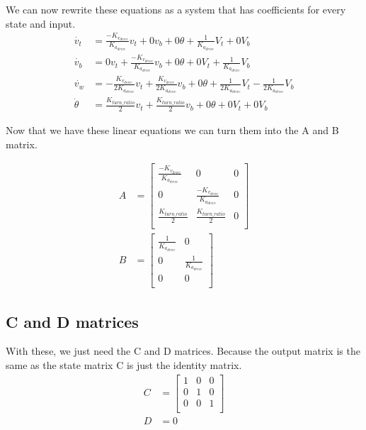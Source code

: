 \documentclass{scrartcl}
\begin{document}
We can now rewrite these equations as a system that has coefficients for every state and input.
\begin{align}
    \dot{v_t}    & = \frac{-K_{v_\mathit{drive}}}{K_{a_\mathit{drive}}}v_t + 0v_b + 0\theta + \frac{1}{K_{a_\mathit{drive}}}V_t + 0V_b                                                                                  \\
    \dot{v_b}    & = 0v_t + \frac{-K_{v_\mathit{drive}}}{K_{a_\mathit{drive}}}v_b + 0\theta + 0V_t + \frac{1}{K_{a_\mathit{drive}}}V_b                                                                                  \\
    \dot{v_w}    & = -\frac{K_{v_\mathit{drive}}}{2K_{a_\mathit{drive}}}v_t + \frac{K_{v_\mathit{drive}}}{2K_{a_\mathit{drive}}}v_b + 0\theta + \frac{1}{2K_{a_\mathit{drive}}}V_t - \frac{1}{2K_{a_\mathit{drive}}}V_b \\
    \dot{\theta} & = \frac{K_\mathit{turn\_ratio}}{2}v_t + \frac{K_\mathit{turn\_ratio}}{2}v_b + 0\theta + 0V_t + 0V_b
\end{align}

Now that we have these linear equations we can turn them into the A and B matrix.

\begin{align}
    A & =
    \begin{bmatrix}
        \frac{-K_{v_\mathit{drive}}}{K_{a_\mathit{drive}}} & 0                                                  & 0 \\
        0                                                  & \frac{-K_{v_\mathit{drive}}}{K_{a_\mathit{drive}}} & 0 \\
        \frac{K_\mathit{turn\_ratio}}{2}                   & \frac{K_\mathit{turn\_ratio}}{2}                   & 0 \\
    \end{bmatrix} \\
    B & =
    \begin{bmatrix}
        \frac{1}{K_{a_\mathit{drive}}} & 0                              \\
        0                              & \frac{1}{K_{a_\mathit{drive}}} \\
        0                              & 0                              \\
    \end{bmatrix}
\end{align}

\subsection{C and D matrices}
With these, we just need the C and D matrices.
Because the output matrix is the same as the state matrix C is just the identity matrix.
\begin{align}
    C & =
    \begin{bmatrix}
        1 & 0 & 0 \\
        0 & 1 & 0 \\
        0 & 0 & 1 \\
    \end{bmatrix} \\
    D & = 0
\end{align}
\end{document}
